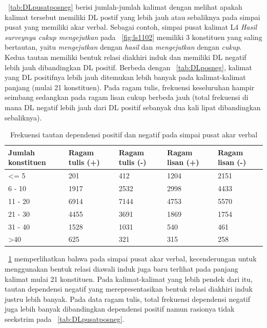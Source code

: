 \tab~\ref{tab:DLpusatposneg} berisi jumlah-jumlah kalimat dengan melihat apakah kalimat tersebut memiliki DL postif yang lebih jauh atau sebaliknya pada simpai pusat yang memiliki akar verbal. Sebagai contoh, simpai pusat kalimat L4 \textit{Hasil surveynya cukup mengejutkan} pada \pic~\ref{fig:ls1102} memiliki 3 konstituen yang saling bertautan, yaitu \textit{mengejutkan} dengan \textit{hasil} dan \textit{mengejutkan} dengan \textit{cukup}. Kedua tautan memiliki bentuk relasi diakhiri induk dan memiliki DL negatif lebih jauh dibandingkan DL positif. Berbeda dengan \tab~\ref{tab:DLposneg}, kalimat yang DL positifnya lebih jauh ditemukan lebih banyak pada kalimat-kalimat panjang (mulai 21 konstituen). Pada ragam tulis, frekuensi keseluruhan hampir seimbang sedangkan pada ragam lisan cukup berbeda jauh (total frekuensi di mana DL negatif lebih jauh dari DL positif sebanyak dua kali lipat dibandingkan sebaliknya). 

\begin{table}
\begin{center}
\begin{small}
\caption{Frekuensi tautan dependensi positif dan negatif pada simpai pusat akar verbal}  \label{tab:tautanpusatposneg}
\begin{tabular}{ | p{2cm} | p{2cm} | p{2cm} | p{2cm} | p{2cm} |}
    \hline
Jumlah konstituen & Ragam tulis (+) & Ragam tulis (-) & Ragam lisan (+) & Ragam lisan (-) \\ \hline
\textless= 5 	& 201	& 412 & 1204 & 2151 \\ \hline
6 - 10 		& 1917	& 2532 & 2998 & 4433 \\ \hline
11 - 20 		& 6914 	& 7144 & 4753 & 5570 \\ \hline
21 - 30 		& 4455	& 3691 & 1869 & 1754 \\ \hline
31 - 40 		& 1528	& 1031 & 540 & 461 \\ \hline
\textgreater 40 	& 625	& 321 & 315 & 258 \\ \hline
   \end{tabular}
   \end{small}
\end{center}
\end{table}

\tab~\ref{tab:tautanpusatposneg} memperlihatkan bahwa pada simpai pusat akar verbal, kecenderungan untuk menggunakan bentuk relasi diawali induk juga baru terlihat pada panjang kalimat mulai 21 konstituen. Pada kalimat-kalimat yang lebih pendek dari itu, tautan dependensi negatif yang merepresentasikan bentuk relasi diakhiri induk justru lebih banyak. Pada data ragam tulis, total frekuensi dependensi negatif juga lebih banyak dibandingkan dependensi positif namun rasionya tidak seekstrim pada \tab~\ref{tab:DLpusatposneg}.

